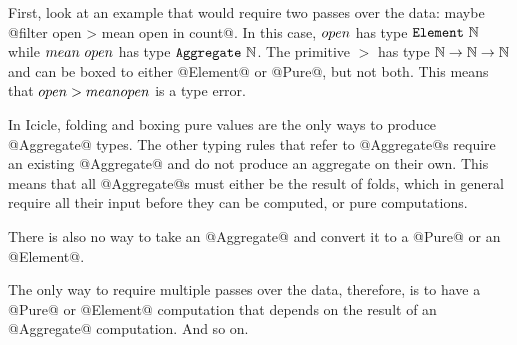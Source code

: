 First, look at an example that would require two passes over the data: maybe @filter open > mean open in count@.
In this case, $\mit{open}$ has type $\mathtt{Element}~\mathbb{N}$ while $\mit{mean~open}$ has type $\mathtt{Aggregate}~\mathbb{N}$.
The primitive $>$ has type $\mathbb{N} \to \mathbb{N} \to \mathbb{N}$ and can be boxed to either @Element@ or @Pure@, but not both.
This means that $\mit{open} > \mit{mean open}$ is a type error.

In Icicle, folding and boxing pure values are the only ways to produce @Aggregate@ types.
The other typing rules that refer to @Aggregate@s require an existing @Aggregate@ and do not produce an aggregate on their own.
This means that all @Aggregate@s must either be the result of folds, which in general require all their input before they can be computed, or pure computations.

There is also no way to take an @Aggregate@ and convert it to a @Pure@ or an @Element@.

The only way to require multiple passes over the data, therefore, is to have a @Pure@ or @Element@ computation that depends on the result of an @Aggregate@ computation.
And so on.


